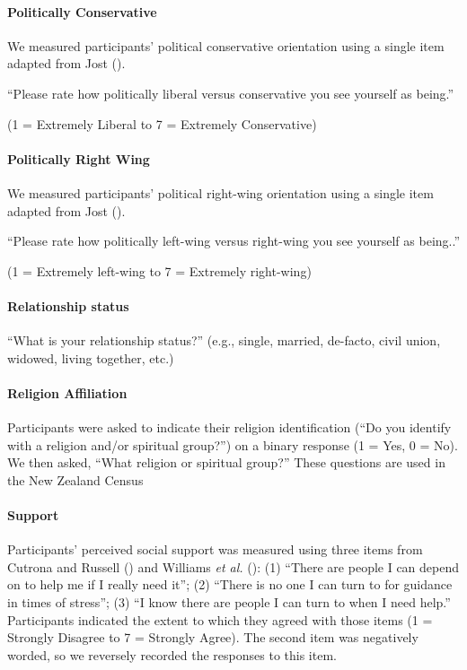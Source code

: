 \documentclass[
  singlecolumn]{article}
\let\oldparagraph\paragraph
\renewcommand{\paragraph}[1]{\oldparagraph{#1}\mbox{}}
\begin{document}
\paragraph{Politically Conservative}\label{politically-conservative}

We measured participants' political conservative orientation using a
single item adapted from Jost ().

``Please rate how politically liberal versus conservative you see
yourself as being.''

(1 = Extremely Liberal to 7 = Extremely Conservative)

\paragraph{Politically Right Wing}\label{politically-right-wing}

We measured participants' political right-wing orientation using a
single item adapted from Jost ().

``Please rate how politically left-wing versus right-wing you see
yourself as being..''

(1 = Extremely left-wing to 7 = Extremely right-wing)

\paragraph{Relationship status}\label{relationship-status}

``What is your relationship status?'' (e.g., single, married, de-facto,
civil union, widowed, living together, etc.)

\paragraph{Religion Affiliation}\label{religion-affiliation}

Participants were asked to indicate their religion identification (``Do
you identify with a religion and/or spiritual group?'') on a binary
response (1 = Yes, 0 = No). We then asked, ``What religion or spiritual
group?'' These questions are used in the New Zealand Census

\paragraph{Support}\label{support}

Participants' perceived social support was measured using three items
from Cutrona and Russell () and Williams
\emph{et al.} (): (1)
``There are people I can depend on to help me if I really need it''; (2)
``There is no one I can turn to for guidance in times of stress''; (3)
``I know there are people I can turn to when I need help.'' Participants
indicated the extent to which they agreed with those items (1 = Strongly
Disagree to 7 = Strongly Agree). The second item was negatively worded,
so we reversely recorded the responses to this item.
\end{document}
